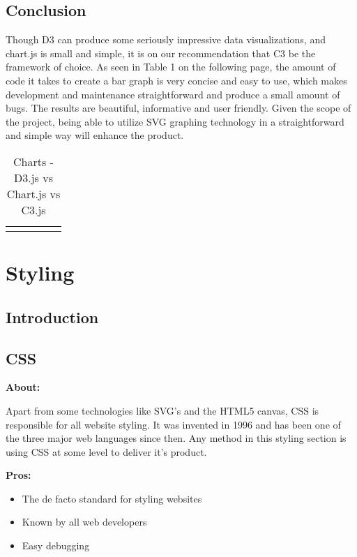 \documentclass[draftclsnofoot,onecolumn,letterpaper,10pt,compsoc]{IEEEtran}
\begin{document}
  \subsection{Conclusion}

  Though D3 can produce some seriously impressive data visualizations, and chart.js is small and simple, it is on our recommendation that C3 be the framework of choice.
  As seen in Table 1 on the following page, the amount of code it takes to create a bar graph is very concise and easy to use, which makes development and maintenance straightforward and produce a small amount of bugs.
  The results are beautiful, informative and user friendly.
  Given the scope of the project, being able to utilize SVG graphing technology in a straightforward and simple way will enhance the product.


  \begin{landscape}
    \begin{table}[]
    \centering
    \caption{Charts - D3.js vs Chart.js vs C3.js}
    \label{my-label}
      \begin{tabular}{lllll}
        &  &  &  & \\
      \end{tabular}
    \end{table}
  \end{landscape}


\section{Styling}

  \subsection{Introduction}
  \subsection{CSS}

    \textbf{About:}

    Apart from some technologies like SVG's and the HTML5 canvas, CSS is responsible for all website styling.
    It was invented in 1996 and has been one of the three major web languages since then.
    Any method in this styling section is using CSS at some level to deliver it's product.

    \textbf{Pros:}
    \begin{itemize}
      \item The de facto standard for styling websites
      \item Known by all web developers
      \item Easy debugging
    \end{itemize}
\end{document}
